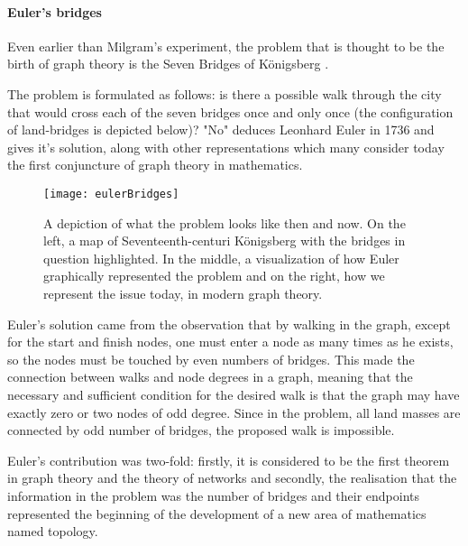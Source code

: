 \paragraph{Euler's bridges}
Even earlier than Milgram's experiment, the problem that is thought to be the birth of graph theory is the Seven Bridges of Königsberg \cite{eulerBridges}.\par
The problem is formulated as follows: is there a possible walk through the city that would cross each of the seven bridges once and only once (the configuration of land-bridges is depicted below)? "No" deduces Leonhard Euler in 1736 and gives it's solution, along with other representations which many consider today the first conjuncture of graph theory in mathematics.
\begin{figure}[!h]
  \centering
  \texttt{[image: eulerBridges]}
  \caption{A depiction of what the problem looks like then and now. On the left, a map of Seventeenth-centuri Königsberg with the bridges in question highlighted. In the middle, a visualization of how Euler graphically represented the problem and on the right, how we represent the issue today, in modern graph theory.}
  \label{fig:eulerBridges}
\end{figure}

Euler's solution came from the observation that by walking in the graph, except for the start and finish nodes, one must enter a node as many times as he exists, so the nodes must be touched by even numbers of bridges. This made the connection between walks and node degrees in a graph, meaning that the necessary and sufficient condition for the desired walk is that the graph may have exactly zero or two nodes of odd degree. Since in the problem, all land masses are connected by odd number of bridges, the proposed walk is impossible.\par 
Euler's contribution was two-fold: firstly, it is considered to be the first theorem in graph theory and the theory of networks and secondly, the realisation that the information in the problem was the number of bridges and their endpoints represented the beginning of the development of a new area of mathematics named topology.



